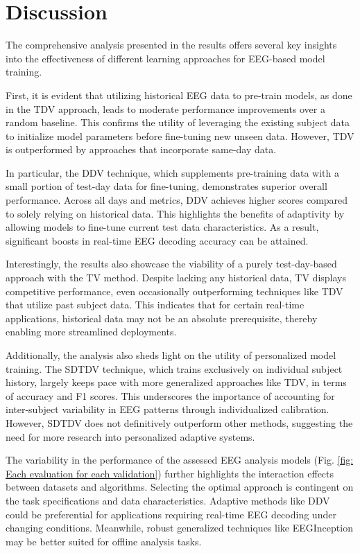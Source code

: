 
\section{Discussion}
    
    The comprehensive analysis presented in the results offers several key insights into the effectiveness of different learning approaches for EEG-based model training. 
    
    First, it is evident that utilizing historical EEG data to pre-train models, as done in the TDV approach, leads to moderate performance improvements over a random baseline. This confirms the utility of leveraging the existing subject data to initialize model parameters before fine-tuning new unseen data. However, TDV is outperformed by approaches that incorporate same-day data.
    
    In particular, the DDV technique, which supplements pre-training data with a small portion of test-day data for fine-tuning, demonstrates superior overall performance. Across all days and metrics, DDV achieves higher scores compared to solely relying on historical data. This highlights the benefits of adaptivity by allowing models to fine-tune current test data characteristics. As a result, significant boosts in real-time EEG decoding accuracy can be attained.
    
    Interestingly, the results also showcase the viability of a purely test-day-based approach with the TV method. Despite lacking any historical data, TV displays competitive performance, even occasionally outperforming techniques like TDV that utilize past subject data. This indicates that for certain real-time applications, historical data may not be an absolute prerequisite, thereby enabling more streamlined deployments.
    
    Additionally, the analysis also sheds light on the utility of personalized model training. The SDTDV technique, which trains exclusively on individual subject history, largely keeps pace with more generalized approaches like TDV, in terms of accuracy and F1 scores. This underscores the importance of accounting for inter-subject variability in EEG patterns through individualized calibration. However, SDTDV does not definitively outperform other methods, suggesting the need for more research into personalized adaptive systems.
    
    
    The variability in the performance of the assessed EEG analysis models (Fig. \ref{fig: Each evaluation for each validation}) further highlights the interaction effects between datasets and algorithms. Selecting the optimal approach is contingent on the task specifications and data characteristics. Adaptive methods like DDV could be preferential for applications requiring real-time EEG decoding under changing conditions. Meanwhile, robust generalized techniques like EEGInception may be better suited for offline analysis tasks.
    
